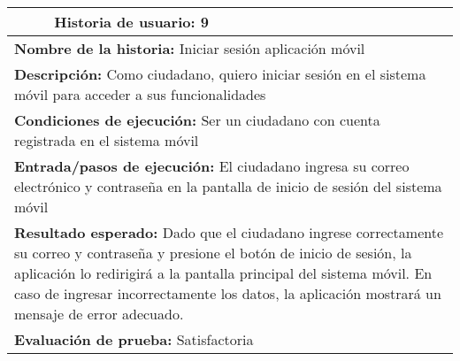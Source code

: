 \begin{longtable}{|p{6.7cm}|p{6.7cm}|}
    \hline
    \endlastfoot
    \multicolumn{1}{|p{6.7cm}|}{\textbf{Número} 9 } & \multicolumn{1}{|p{6.7cm}|}{\textbf{Historia de usuario:} 9}                                                                                                                                                                                                                                    \\
    \hline
    \multicolumn{2}{|p{13.4cm}|}{\textbf{Nombre de la historia:} Iniciar sesión aplicación móvil }                                                                                                                                                                                                                                                    \\
    \hline
    \multicolumn{2}{|p{13.4cm}|}{\textbf{Descripción:} Como ciudadano, quiero iniciar sesión en el sistema móvil para acceder a sus funcionalidades}                                                                                                                                                                                                  \\
    \hline
    \multicolumn{2}{|p{13.4cm}|}{\textbf{Condiciones de ejecución:} Ser un ciudadano con cuenta registrada en el sistema móvil}                                                                                                                                                                                                                       \\
    \hline
    \multicolumn{2}{|p{13.4cm}|}{\textbf{Entrada/pasos de ejecución:} El ciudadano ingresa su correo electrónico y contraseña en la pantalla de inicio de sesión del sistema móvil}                                                                                                                                                                   \\
    \hline
    \multicolumn{2}{|p{13.4cm}|}{\textbf{Resultado esperado:} Dado que el ciudadano ingrese correctamente su correo y contraseña y presione el botón de inicio de sesión, la aplicación lo redirigirá a la pantalla principal del sistema móvil. En caso de ingresar incorrectamente los datos, la aplicación mostrará un mensaje de error adecuado.} \\
    \hline
    \multicolumn{2}{|p{13.4cm}|}{\textbf{Evaluación de prueba:} Satisfactoria}                                                                                                                                                                                                                                                                        \\
    \hline
\end{longtable}


